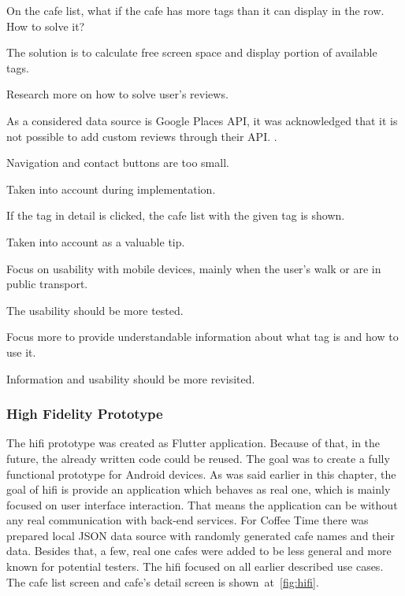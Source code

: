 \begin{questions}
  \item On the cafe list, what if the cafe has more tags than it can display in the row. How to solve it? 
         \begin{answer}
          The solution is to calculate free screen space and display portion of available tags.
         \end{answer}

  \item Research more on how to solve user's reviews.
         \begin{answer}
         As a considered data source is Google Places API, it was acknowledged that it is not possible to add custom reviews through their API. .
         \end{answer}
    \item Navigation and contact buttons are too small. 
        \begin{answer}
        Taken into account during implementation.
        \end{answer}
    \item If the tag in detail is clicked, the cafe list with the given tag is shown.
        \begin{answer}
        Taken into account as a valuable tip.
        \end{answer}
    \item Focus on usability with mobile devices, mainly when the user's walk or are in public transport.
        \begin{answer}
        The usability should be more tested. 
        \end{answer}
    \item Focus more to provide understandable information about what tag is and how to use it.
     \begin{answer}
        Information and usability should be more revisited.
    \end{answer}
\end{questions}

\subsubsection{High Fidelity Prototype}
The \gls{hifi} prototype was created as Flutter application. Because of that, in the future, the already written code could be reused.  The goal was to create a fully functional prototype for Android devices. As was said earlier in this chapter, the goal of \gls{hifi} is provide an application which behaves as real one, which is mainly focused on user interface interaction. That means the application can be without any real communication with back-end services. For Coffee Time there was prepared local JSON data source with randomly generated cafe names and their data. Besides that, a few, real one cafes were added to be less general and more known for potential testers. The \gls{hifi} focused on all earlier described use cases. The cafe list screen and cafe's detail screen is shown~at~\cref{fig:hifi}.

